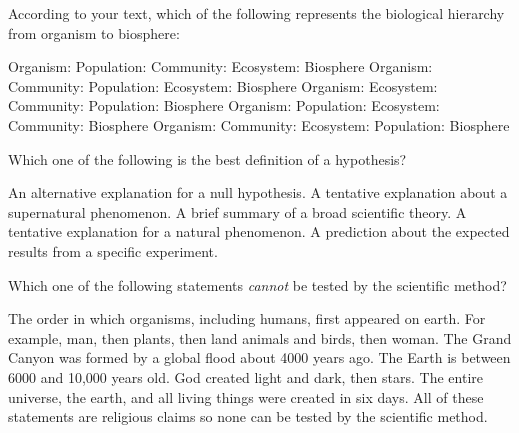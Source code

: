 \question
According to your text, which of the following represents the biological hierarchy from organism to biosphere:

\begin{choices}
\correctchoice Organism: Population: Community: Ecosystem: Biosphere %
\choice Organism: Community: Population: Ecosystem: Biosphere %
\choice Organism: Ecosystem: Community: Population: Biosphere %
\choice Organism: Population: Ecosystem: Community: Biosphere %
\choice Organism: Community: Ecosystem: Population: Biosphere %
\end{choices}


\question
Which one of the following is the best definition of a hypothesis?

\begin{choices}
\choice An alternative explanation for a null hypothesis.%
\choice A tentative explanation about a supernatural phenomenon.%
\choice A brief summary of a broad scientific theory.%
\correctchoice A tentative explanation for a natural phenomenon.%
\choice A prediction about the expected results from a specific experiment.%
\end{choices}

\question
Which one of the following statements \emph{cannot} be tested by the scientific method?

\begin{choices}
\choice The order in which organisms, including humans, first appeared on earth. For example, man, then plants, then land animals and birds, then woman.%
\choice The Grand Canyon was formed by a global flood about 4000 years ago.%
\choice The Earth is between 6000 and 10,000 years old.%
\correctchoice God created light and dark, then stars.%
\choice The entire universe, the earth, and all living things were created in six days.%
\choice All of these statements are religious claims so none can be tested by the scientific method.%
\end{choices}
